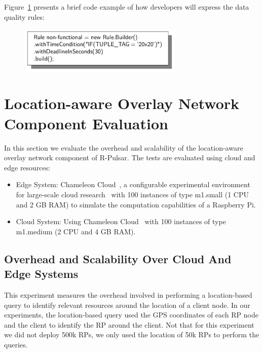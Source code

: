Figure~\ref{fig:qosRule} presents a brief code example of how developers will express the data quality rules:

\begin{figure}[h!]
  \centering
  \includegraphics[width=0.7\textwidth]{Figures/qosRule.pdf}
  \caption{}\label{fig:qosRule}
\end{figure}


\section{Location-aware Overlay Network Component Evaluation}

In this section we evaluate the overhead and scalability of the location-aware overlay network component of R-Pulsar. The tests are evaluated using cloud and edge resources:

\begin{itemize}
\item Edge System:  Chameleon Cloud~\cite{chameleon}, a configurable experimental environment for large-scale cloud research~\cite{chameleon} with 100 instances of type m1.small (1 CPU and 2 GB RAM) to simulate the computation capabilities of a Raspberry Pi.

\item Cloud System: Using Chameleon Cloud~\cite{chameleon} with 100 instances of type m1.medium (2 CPU and 4 GB RAM).
\end{itemize}

\subsection{Overhead and Scalability Over Cloud And Edge Systems}

This experiment measures the overhead involved in performing a location-based query to identify relevant resources around the location of a client node. In our experiments, the location-based query used the GPS coordinates of each RP node and the client to identify the RP around the client. Not that for this experiment we did not deploy 500k RPs, we only used the location of 50k RPs to perform the queries.

